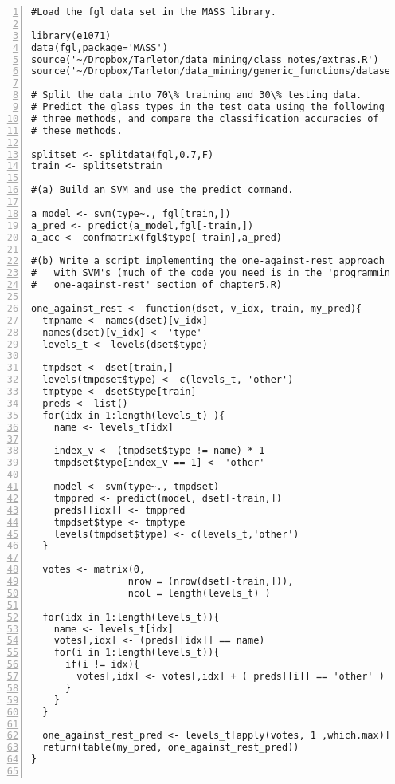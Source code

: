 \documentclass[11pt]{article}
\begin{document}
\begin{enumerate}
\begin{enumerate}
\end{enumerate}
\end{enumerate}
\begin{Verbatim}[numbers=left]
#Load the fgl data set in the MASS library. 

library(e1071)
data(fgl,package='MASS')
source('~/Dropbox/Tarleton/data_mining/class_notes/extras.R')
source('~/Dropbox/Tarleton/data_mining/generic_functions/dataset_ops.R')

# Split the data into 70\% training and 30\% testing data. 
# Predict the glass types in the test data using the following
# three methods, and compare the classification accuracies of 
# these methods.

splitset <- splitdata(fgl,0.7,F)
train <- splitset$train

#(a) Build an SVM and use the predict command.

a_model <- svm(type~., fgl[train,])
a_pred <- predict(a_model,fgl[-train,])
a_acc <- confmatrix(fgl$type[-train],a_pred)

#(b) Write a script implementing the one-against-rest approach 
#   with SVM's (much of the code you need is in the 'programming
#   one-against-rest' section of chapter5.R)

one_against_rest <- function(dset, v_idx, train, my_pred){
  tmpname <- names(dset)[v_idx]
  names(dset)[v_idx] <- 'type'
  levels_t <- levels(dset$type)
 
  tmpdset <- dset[train,]
  levels(tmpdset$type) <- c(levels_t, 'other')
  tmptype <- dset$type[train]
  preds <- list()
  for(idx in 1:length(levels_t) ){
  	name <- levels_t[idx]
  	
    index_v <- (tmpdset$type != name) * 1
    tmpdset$type[index_v == 1] <- 'other'    

 	model <- svm(type~., tmpdset)
 	tmppred <- predict(model, dset[-train,])
 	preds[[idx]] <- tmppred
 	tmpdset$type <- tmptype
    levels(tmpdset$type) <- c(levels_t,'other')
  }

  votes <- matrix(0, 
                 nrow = (nrow(dset[-train,])), 
                 ncol = length(levels_t) )

  for(idx in 1:length(levels_t)){
    name <- levels_t[idx]
    votes[,idx] <- (preds[[idx]] == name)
    for(i in 1:length(levels_t)){
      if(i != idx){
        votes[,idx] <- votes[,idx] + ( preds[[i]] == 'other' )
      }
    }
  }

  one_against_rest_pred <- levels_t[apply(votes, 1 ,which.max)]
  return(table(my_pred, one_against_rest_pred))
}


\end{Verbatim}
\end{document}
